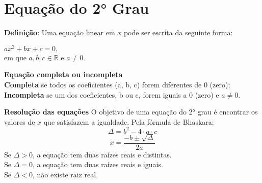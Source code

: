 	\section{Equação do 2° Grau}

    \noindent
	\textbf{Definição}:	Uma equação linear em $x$ pode ser escrita da seguinte forma:
     \begin{tcolorbox}[colback=white,colframe=minha_cor,coltitle=black,title=Definição] 
        \begin{center}
            $ax^2+bx+c=0,$\\
		  em que $a, b, c \in \mathbb{R}$ e $a \neq 0$.
        \end{center}
        \end{tcolorbox}

    \noindent
	\textbf{Equação completa ou incompleta}\\
 
	\noindent
	\textbf{Completa} se todos os coeficientes (a, b, c) forem diferentes de 0 (zero); \\
 
	\noindent
	\textbf{Incompleta} se um dos coeficientes, b ou c, forem iguais a 0 (zero) e $a \neq 0$.

    \begin{texample}
        \centering
    \end{texample}
    
    \noindent
	\textbf{Resolução das equações}
    	O objetivo de uma equação do 2° grau é encontrar os valores de $x$ que satisfazem a igualdade.
	Pela fórmula de Bhaskara:
	\[
	\Delta = b^2 - 4 \cdot a \cdot c
	\]
	\[
	x = \dfrac{-b \pm \sqrt{ \Delta}}{2a}
	\]
	Se $\Delta > 0$, a equação tem duas raízes reais e distintas.\\
	Se $\Delta = 0$, a equação tem duas raízes reais e iguais.\\
	Se $\Delta < 0$, não existe raiz real.


